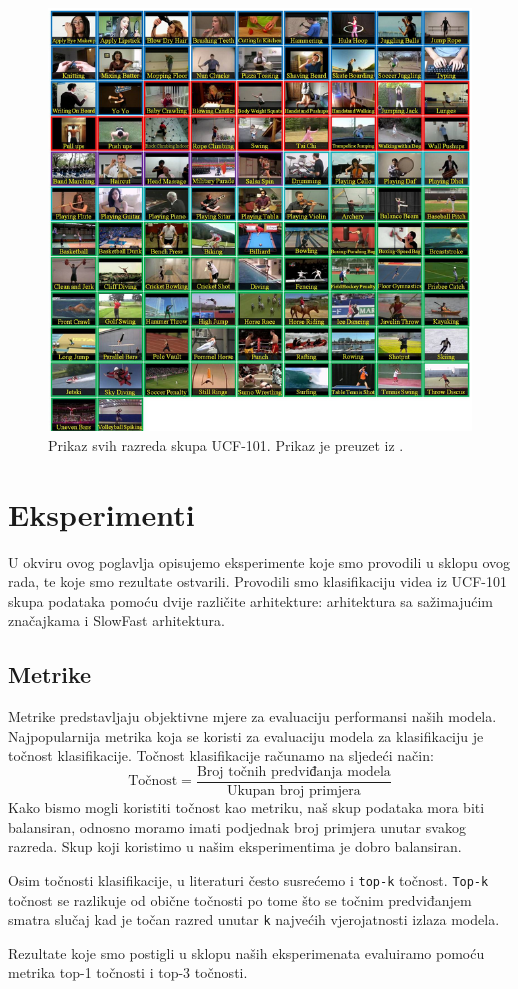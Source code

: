 \documentclass[times, utf8, diplomski,  numeric]{fer}
\begin{document}
\begin{figure}[htp]

\centering
\includegraphics[width=\textwidth]{./images/ucf-101}\hfill

\caption{Prikaz svih razreda skupa UCF-101. Prikaz je preuzet iz \cite{ucf101}.}
\label{fig:ucf101}
\end{figure}
\chapter{Eksperimenti}
U okviru ovog poglavlja opisujemo eksperimente koje smo provodili u sklopu ovog rada, te koje smo rezultate ostvarili. Provodili smo klasifikaciju videa iz UCF-101 skupa podataka pomoću dvije različite arhitekture: arhitektura sa sažimajućim značajkama i SlowFast arhitektura.
\section{Metrike}
Metrike predstavljaju objektivne mjere za evaluaciju performansi naših modela. Najpopularnija metrika koja se koristi za evaluaciju modela za klasifikaciju je točnost klasifikacije. Točnost klasifikacije računamo na sljedeći način:
\begin{equation}
\text{Točnost} = \frac{\text{Broj točnih predviđanja modela}}{\text{Ukupan broj primjera}}
\end{equation}
Kako bismo mogli koristiti točnost kao metriku, naš skup podataka mora biti balansiran, odnosno moramo imati podjednak broj primjera unutar svakog razreda. Skup koji koristimo u našim eksperimentima je dobro balansiran.
\par
Osim točnosti klasifikacije, u literaturi često susrećemo i \verb|top-k| točnost. \verb|Top-k| točnost se razlikuje od obične točnosti po tome što se točnim predviđanjem smatra slučaj kad je točan razred unutar \verb|k| najvećih vjerojatnosti izlaza modela.
\par
Rezultate koje smo postigli u sklopu naših eksperimenata evaluiramo pomoću metrika top-1 točnosti i top-3 točnosti.
\end{document}
